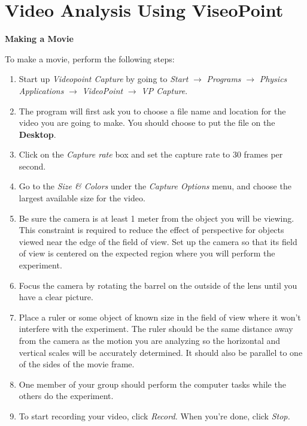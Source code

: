 
\section{Video Analysis Using ViseoPoint}

\textbf{Making a Movie} 

To make a movie, perform the following steps:

\begin{enumerate}
\item Start up \textit{Videopoint Capture} by
going to \textit{Start} $\rightarrow$ \textit{Programs} $\rightarrow$
\textit{Physics Applications} $\rightarrow$ \textit{VideoPoint}
$\rightarrow$ \textit{VP Capture}.

\item The program will first ask you to choose a file name and location for 
the video you are going to make.  You should choose to put the file
on the \textbf{Desktop}.

\item Click on the \textit{Capture rate}
box and set the capture rate to 30 frames per second. 

\item Go to the \textit{Size \& Colors} under the \textit{Capture Options} 
menu, and choose the largest available size for the video.



\item Be sure the camera is at least 1 meter from the object
you will be viewing. This constraint is required to reduce the effect
of perspective for objects viewed near the edge of the field of view.
Set up the camera so that its field of view is centered on the expected
region where you will perform the experiment. 
\item Focus the camera by rotating the barrel on the outside
of the lens until you have a clear picture.
\item Place a ruler or some
object of known size in the field of view where it won't interfere
with the experiment. The ruler should be the same distance away from
the camera as the motion you are analyzing so the horizontal and vertical 
scales will be accurately determined. It should also be parallel to one of the
sides of the movie frame.
\item One member of your group should perform the computer tasks while the
others do the experiment. 
\item To start recording your video, click \textit{Record.}  When
you're done, click \textit{Stop.}


\end{enumerate}
